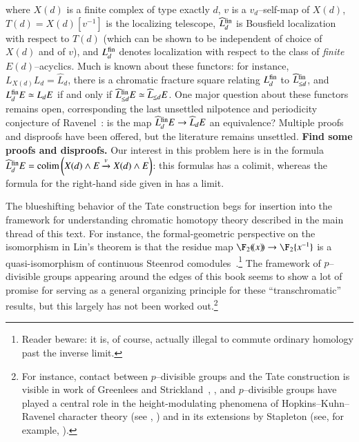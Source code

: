 {where $X(d)$ is a finite complex of type exactly $d$, $v$ is a $v_d$--self-map of $X(d)$, $T(d) = X(d)[v^{-1}]$ is the localizing telescope, $\widehat L_d^{\mathrm{fin}}$ is Bousfield localization with respect to $T(d)$ (which can be shown to be independent of choice of $X(d)$ and of $v$), and $L_d^{\mathrm{fin}}$ denotes localization with respect to the class of \emph{finite} $E(d)$--acyclics.  Much is known about these functors: for instance, $L_{X(d)} L_d = \widehat L_d$, there is a chromatic fracture square relating $L_d^{\mathrm{fin}}$ to $\widehat L_{\le d}^{\mathrm{fin}}$, and $L_d^{\mathrm{fin}} E \simeq L_d E$ if and only if $\widehat L_{\le d}^{\mathrm{fin}} E \simeq \widehat L_{\le d} E$.  One major question about these functors remains open, corresponding the last unsettled nilpotence and periodicity conjecture of Ravenel~\cite[Conjecture 10.5]{RavenelLocalizationWRTPeriodic}: is the map $\widehat L_d^{\mathrm{fin}} E \to \widehat L_d E$ an equivalence?  Multiple proofs and disproofs have been offered, but the literature remains unsettled. \textbf{Find some proofs and disproofs.}  Our interest in this problem here is in the formula $\widehat L_d^{\mathrm{fin}} E = \operatorname*{colim}\left(X(d) \wedge E \xrightarrow{v} X(d) \wedge E\right)$: this formulas has a colimit, whereas the formula for the right-hand side given in  has a limit.}

The blueshifting behavior of the Tate construction begs for insertion into the framework for understanding chromatic homotopy theory described in the main thread of this text.  For instance, the formal-geometric perspective on the isomorphism in Lin's theorem is that the residue map $\F_2(\!(x)\!) \to \F_2\{x^{-1}\}$ is a quasi-isomorphism of continuous Steenrod comodules~\cite[Remark 8.34]{StricklandFSFG}.\footnote{Reader beware: it is, of course, actually illegal to commute ordinary homology past the inverse limit.}  The framework of $p$--divisible groups appearing around the edges of this book seems to show a lot of promise for serving as a general organizing principle for these ``transchromatic'' results, but this largely has not been worked out.\footnote{For instance, contact between $p$--divisible groups and the Tate construction is visible in work of Greenlees and Strickland~\cite{GreenleesStrickland}, \cite[pg.\ 10]{StricklandFPFP}, and $p$--divisible groups have played a central role in the height-modulating phenomena of Hopkins--Kuhn--Ravenel character theory (see , \cite{HKR}) and in its extensions by Stapleton (see, for example, \cite{Stapleton}).}






